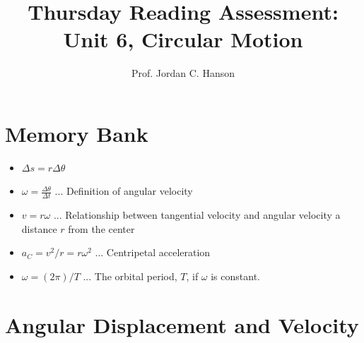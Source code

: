 \documentclass{article}
\begin{document}
\title{Thursday Reading Assessment: Unit 6, Circular Motion}
\author{Prof. Jordan C. Hanson}

\maketitle

\section{Memory Bank}

\begin{itemize}
\item $\Delta s = r \Delta \theta$
\item $\omega = \frac{\Delta \theta}{\Delta t}$ ... Definition of angular velocity
\item $v = r\omega $ ... Relationship between tangential velocity and angular velocity a distance $r$ from the center
\item $a_C = v^2/r = r \omega^2$ ... Centripetal acceleration\
\item $\omega = (2\pi)/T$ ... The orbital period, $T$, if $\omega$ is constant.
\end{itemize}

\section{Angular Displacement and Velocity}
\end{document}
